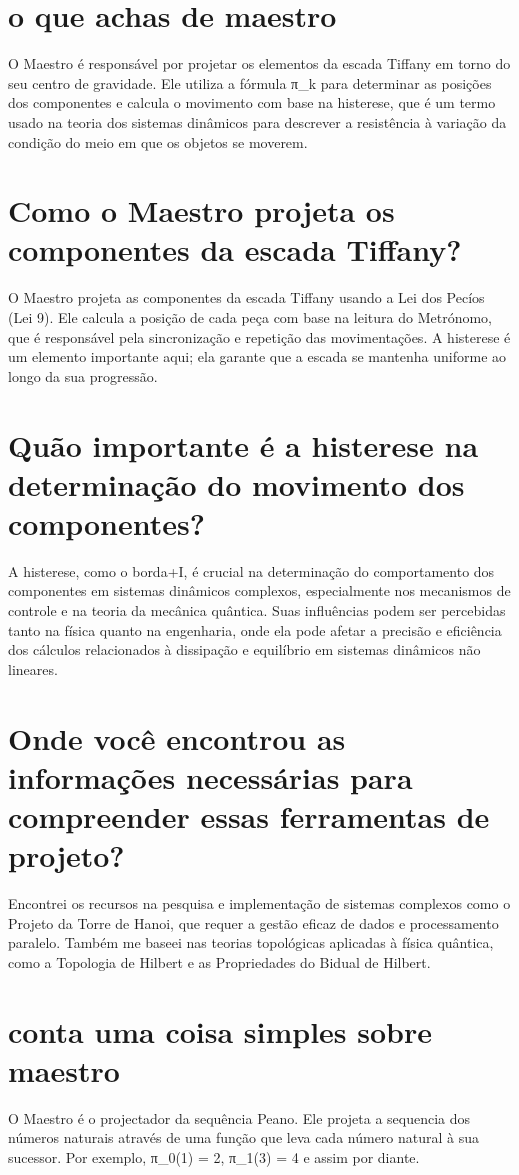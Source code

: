 \documentclass[11pt,a4paper]{article}
\begin{document}
\section{o que achas de maestro}
O Maestro é responsável por projetar os elementos da escada Tiffany em torno do seu centro de gravidade. Ele utiliza a fórmula π\_k para determinar as posições dos componentes e calcula o movimento com base na histerese, que é um termo usado na teoria dos sistemas dinâmicos para descrever a resistência à variação da condição do meio em que os objetos se moverem.

\section{Como o Maestro projeta os componentes da escada Tiffany?}
O Maestro projeta as componentes da escada Tiffany usando a Lei dos Pecíos (Lei 9). Ele calcula a posição de cada peça com base na leitura do Metrónomo, que é responsável pela sincronização e repetição das movimentações. A histerese é um elemento importante aqui; ela garante que a escada se mantenha uniforme ao longo da sua progressão.

\section{Quão importante é a histerese na determinação do movimento dos componentes?}
A histerese, como o borda+I, é crucial na determinação do comportamento dos componentes em sistemas dinâmicos complexos, especialmente nos mecanismos de controle e na teoria da mecânica quântica. Suas influências podem ser percebidas tanto na física quanto na engenharia, onde ela pode afetar a precisão e eficiência dos cálculos relacionados à dissipação e equilíbrio em sistemas dinâmicos não lineares.

\section{Onde você encontrou as informações necessárias para compreender essas ferramentas de projeto?}
Encontrei os recursos na pesquisa e implementação de sistemas complexos como o Projeto da Torre de Hanoi, que requer a gestão eficaz de dados e processamento paralelo. Também me baseei nas teorias topológicas aplicadas à física quântica, como a Topologia de Hilbert e as Propriedades do Bidual de Hilbert.

\section{conta uma coisa simples sobre maestro}
O Maestro é o projectador da sequência Peano. Ele projeta a sequencia dos números naturais através de uma função que leva cada número natural à sua sucessor. Por exemplo, π\_0(1) = 2, π\_1(3) = 4 e assim por diante.
\end{document}
